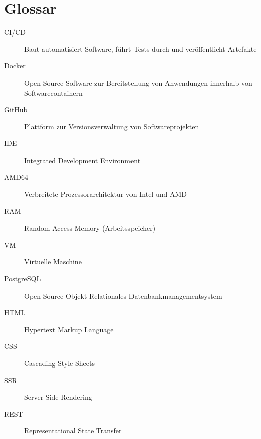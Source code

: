 
\chapter{Glossar}

\begin{description}
\item[CI/CD] Baut automatisiert Software, führt Tests durch und veröffentlicht Artefakte
\item[Docker] Open-Source-Software zur Bereitstellung von Anwendungen innerhalb von Softwarecontainern
\item[GitHub] Plattform zur Versionsverwaltung von Softwareprojekten
\item[IDE] Integrated Development Environment
\item[AMD64] Verbreitete Prozessorarchitektur von Intel und AMD
\item[RAM] Random Access Memory (Arbeitsspeicher)
\item[VM] Virtuelle Maschine
\item[PostgreSQL] Open-Source Objekt-Relationales Datenbankmanagementsystem
\item[HTML] Hypertext Markup Language
\item[CSS] Cascading Style Sheets
\item[SSR] Server-Side Rendering
\item[REST] Representational State Transfer
\end{description}